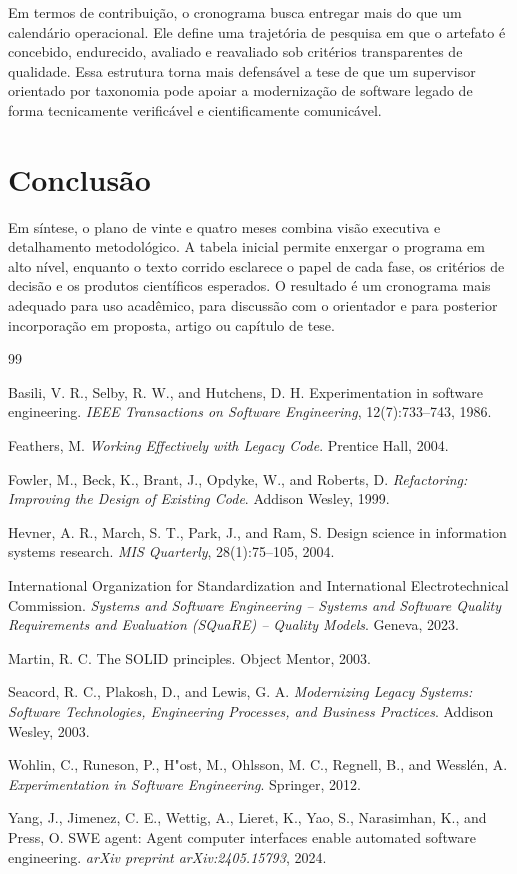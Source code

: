 \documentclass[12pt,a4paper]{article}
\begin{document}
Em termos de contribuição, o cronograma busca entregar mais do que um calendário operacional. Ele define uma trajetória de pesquisa em que o artefato é concebido, endurecido, avaliado e reavaliado sob critérios transparentes de qualidade. Essa estrutura torna mais defensável a tese de que um supervisor orientado por taxonomia pode apoiar a modernização de software legado de forma tecnicamente verificável e cientificamente comunicável.

\section{Conclusão}

Em síntese, o plano de vinte e quatro meses combina visão executiva e detalhamento metodológico. A tabela inicial permite enxergar o programa em alto nível, enquanto o texto corrido esclarece o papel de cada fase, os critérios de decisão e os produtos científicos esperados. O resultado é um cronograma mais adequado para uso acadêmico, para discussão com o orientador e para posterior incorporação em proposta, artigo ou capítulo de tese.

\begin{thebibliography}{99}

Basili, V. R., Selby, R. W., and Hutchens, D. H.
Experimentation in software engineering.
\textit{IEEE Transactions on Software Engineering}, 12(7):733--743, 1986.

Feathers, M.
\textit{Working Effectively with Legacy Code}.
Prentice Hall, 2004.

Fowler, M., Beck, K., Brant, J., Opdyke, W., and Roberts, D.
\textit{Refactoring: Improving the Design of Existing Code}.
Addison Wesley, 1999.

Hevner, A. R., March, S. T., Park, J., and Ram, S.
Design science in information systems research.
\textit{MIS Quarterly}, 28(1):75--105, 2004.

International Organization for Standardization and International Electrotechnical Commission.
\textit{Systems and Software Engineering -- Systems and Software Quality Requirements and Evaluation (SQuaRE) -- Quality Models}.
Geneva, 2023.

Martin, R. C.
The SOLID principles.
Object Mentor, 2003.

Seacord, R. C., Plakosh, D., and Lewis, G. A.
\textit{Modernizing Legacy Systems: Software Technologies, Engineering Processes, and Business Practices}.
Addison Wesley, 2003.

Wohlin, C., Runeson, P., H{"o}st, M., Ohlsson, M. C., Regnell, B., and Wessl{\'e}n, A.
\textit{Experimentation in Software Engineering}.
Springer, 2012.

Yang, J., Jimenez, C. E., Wettig, A., Lieret, K., Yao, S., Narasimhan, K., and Press, O.
SWE agent: Agent computer interfaces enable automated software engineering.
\textit{arXiv preprint arXiv:2405.15793}, 2024.

\end{thebibliography}
\end{document}
